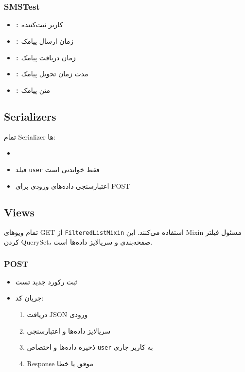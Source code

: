 \documentclass{report}
\begin{document}
\subsubsection{SMSTest}
\begin{itemize}
    \item \texttt{:} کاربر ثبت‌کننده
    \item \texttt{:} زمان ارسال پیامک
    \item \texttt{:} زمان دریافت پیامک
    \item \texttt{:} مدت زمان تحویل پیامک  
    \item \texttt{:} متن پیامک
\end{itemize}

\subsection{Serializers}
تمام  Serializer ها:
\begin{itemize}
    \item \texttt{}
\end{itemize}

\begin{itemize}
    \item فیلد \texttt{user} فقط خواندنی است
    \item اعتبارسنجی داده‌های ورودی برای POST
\end{itemize}

\subsection{Views}
تمام ویوهای GET از \texttt{FilteredListMixin} استفاده می‌کنند.
این Mixin مسئول فیلتر کردن QuerySet، صفحه‌بندی و سریالایز داده‌ها است.

\subsubsection{POST}
\begin{itemize}
    \item ثبت رکورد جدید تست
    \item جریان کد:
    \begin{enumerate}
        \item دریافت JSON ورودی
        \item سریالایز داده‌ها و اعتبارسنجی
        \item ذخیره داده‌ها و اختصاص \texttt{user} به کاربر جاری
        \item Response موفق  یا خطا 
    \end{enumerate}
\end{itemize}
\end{document}
